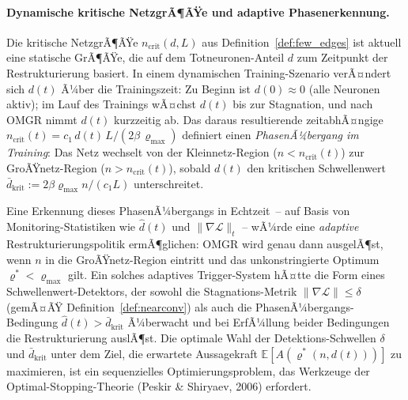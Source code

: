 ﻿\documentclass[12pt, a4paper, openany]{report}
\newcommand{\E}{\mathbb{E}}
\newcommand{\calL}{\mathcal{L}}
\begin{document}
\paragraph{Dynamische kritische NetzgrÃ¶ÃŸe und adaptive Phasenerkennung.}
Die kritische NetzgrÃ¶ÃŸe $n_{\mathrm{crit}}(d, L)$ aus
Definition~\ref{def:few_edges} ist aktuell eine statische GrÃ¶ÃŸe, die auf
dem Totneuronen-Anteil $d$ zum Zeitpunkt der Restrukturierung basiert.  In
einem dynamischen Training-Szenario verÃ¤ndert sich $d(t)$ Ã¼ber die
Trainingszeit: Zu Beginn ist $d(0) \approx 0$ (alle Neuronen aktiv); im Lauf
des Trainings wÃ¤chst $d(t)$ bis zur Stagnation, und nach OMGR nimmt $d(t)$
kurzzeitig ab.  Das daraus resultierende zeitabhÃ¤ngige
$n_{\mathrm{crit}}(t) = c_1\,d(t)\,L / (2\beta\,\varrho_{\max})$
definiert einen \emph{PhasenÃ¼bergang im Training}: Das Netz wechselt von
der Kleinnetz-Region ($n < n_{\mathrm{crit}}(t)$) zur GroÃŸnetz-Region
($n > n_{\mathrm{crit}}(t)$), sobald $d(t)$ den kritischen Schwellenwert
$\bar{d}_{\mathrm{krit}} := 2\beta\varrho_{\max} n / (c_1 L)$ unterschreitet.

Eine Erkennung dieses PhasenÃ¼bergangs in Echtzeit~-- auf Basis von
Monitoring-Statistiken wie $\hat{d}(t)$ und $\|\nabla\calL\|_{t}$ -- wÃ¼rde
eine \emph{adaptive} Restrukturierungspolitik ermÃ¶glichen: OMGR wird genau
dann ausgelÃ¶st, wenn $n$ in die GroÃŸnetz-Region eintritt und das
unkonstringierte Optimum $\varrho^* < \varrho_{\max}$ gilt.  Ein solches
adaptives Trigger-System hÃ¤tte die Form eines Schwellenwert-Detektors, der
sowohl die Stagnations-Metrik $\|\nabla\calL\| \leq \delta$ (gemÃ¤ÃŸ
Definition~\ref{def:nearconv}) als auch die PhasenÃ¼bergangs-Bedingung
$\hat{d}(t) > \bar{d}_{\mathrm{krit}}$ Ã¼berwacht und bei ErfÃ¼llung beider
Bedingungen die Restrukturierung auslÃ¶st.  Die optimale Wahl der
Detektions-Schwellen $\delta$ und $\bar{d}_{\mathrm{krit}}$ unter dem
Ziel, die erwartete Aussagekraft $\E[A(\varrho^*(n, d(t)))]$ zu maximieren,
ist ein sequenzielles Optimierungsproblem, das Werkzeuge der
Optimal-Stopping-Theorie (Peskir \& Shiryaev, 2006) erfordert.
\end{document}
